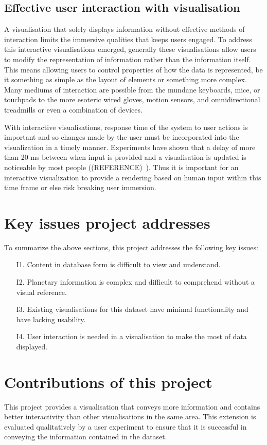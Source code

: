 \subsection{Effective user interaction with visualisation}
A visualisation that solely displays information without effective methods of
interaction limits the immersive qualities that keeps users engaged. To address
this interactive visualisations emerged, generally these visualisations allow
users to modify the representation of information rather than the information
itself. This means allowing users to control properties of how the data is
represented, be it something as simple as the layout of elements or something
more complex. Many mediums of interaction are possible from the mundane
keyboards, mice, or touchpads to the more esoteric wired gloves, motion sensors,
and omnidirectional treadmills or even a combination of devices.

With interactive visualisations, response time of the system to user actions is
important and so changes made by the user must be incorporated into the
visualization in a timely manner. Experiments have shown that a delay of more
than 20 ms between when input is provided and a visualisation is updated is
noticeable by most people ((REFERENCE)~). Thus it is important for an
interactive visualization to provide a rendering based on human input within
this time frame or else risk breaking user immersion.

\section{Key issues project addresses}
To summarize the above sections, this project addresses the following key
issues:
\begin{enumerate}
 \item[I1.] Content in database form is difficult to view and understand.
 \item[I2.] Planetary information is complex and difficult to comprehend without
a visual reference.
 \item[I3.] Existing visualisations for this dataset have minimal functionality
and have lacking usability.
 \item[I4.] User interaction is needed in a visualisation to make the most of
data displayed.
\end{enumerate}

\section{Contributions of this project}
This project provides a visualisation that conveys more information and
contains better interactivity than other visualisations in the same area. This
extension is evaluated qualitatively by a user experiment to ensure that it
is successful in conveying the information contained in the dataset.

